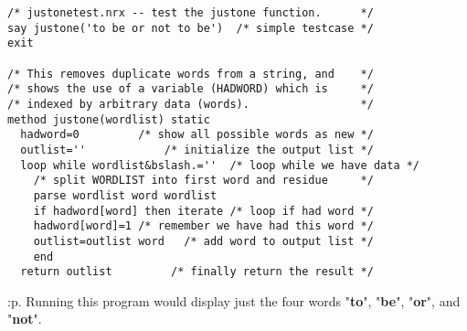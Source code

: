 \begin{verbatim}
/* justonetest.nrx -- test the justone function.      */
say justone('to be or not to be')  /* simple testcase */
exit

/* This removes duplicate words from a string, and    */
/* shows the use of a variable (HADWORD) which is     */
/* indexed by arbitrary data (words).                 */
method justone(wordlist) static
  hadword=0         /* show all possible words as new */
  outlist=''            /* initialize the output list */
  loop while wordlist&bslash.=''  /* loop while we have data */
    /* split WORDLIST into first word and residue     */
    parse wordlist word wordlist
    if hadword[word] then iterate /* loop if had word */
    hadword[word]=1 /* remember we have had this word */
    outlist=outlist word   /* add word to output list */
    end
  return outlist         /* finally return the result */
\end{verbatim}
:p.
Running this program would display just the four words
"\textbf{to}", "\textbf{be}", "\textbf{or}", and
"\textbf{not}".
